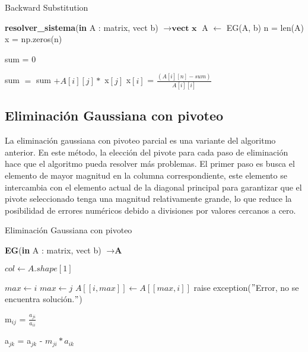 \begin{algorithm}
\caption{Backward Substitution}\label{backwardSubst}
\begin{algorithmic}
\State \textbf{resolver\_sistema}(\textbf{in} A : matrix, vect b) $\to \textbf{vect x}$
 \State A $\gets$ EG(A, b) 
\State n = len(A)
\State x = np.zeros(n)

        \State sum = 0
        
                \State sum $=$ sum $+ A[i][j] *$ x$[j]$
             \EndIf       
            \State x$[i]$ = $\frac{(A[i][n] - sum)}{A[i][i]}$
        \EndFor
   \EndFor
{}
\end{algorithmic}
\end{algorithm}

\subsection{Eliminación Gaussiana con pivoteo} \label{seccion_EG_pivot}
La eliminación gaussiana con pivoteo parcial es una variante del algoritmo anterior.
En este método, la elección del pivote para cada paso de eliminación hace que el algoritmo pueda resolver más problemas. El primer paso es busca el elemento de mayor magnitud en la columna correspondiente, este elemento se intercambia con el elemento actual de la diagonal principal para garantizar que el pivote seleccionado tenga una magnitud relativamente grande, lo que reduce la posibilidad de errores numéricos debido a divisiones por valores cercanos a cero.

\begin{algorithm}
\caption{Eliminación Gaussiana con pivoteo}\label{backwardSubst}
\begin{algorithmic}
\State \textbf{EG}(\textbf{in} A : matrix, vect b) $\to \textbf{A}$
 
 \State $col \gets A.shape[1]$
 
        \State $max \gets i$
                \State $max \gets j$
            \EndIf
        \EndFor
        \State $A[[i,max]] \gets A[[max,i]]$
    \EndIf
        \State  raise exception($"$Error, no se encuentra solución.$"$) 
    \EndIf
\EndFor
{}

    \State m$_{ij}$ = $\frac{a_{ji}}{a_{ii}}$
    
        \State a$_{jk}$ = a$_{jk}$ - $m_{ji}*{a_{ik}}$
    \EndFor

\EndFor
\end{algorithmic}
\end{algorithm}


